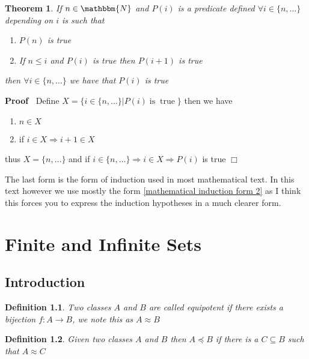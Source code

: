 \documentclass{book}
\newcommand{\tmop}[1]{\ensuremath{\operatorname{#1}}}
\newcommand{\upl}{+}
\newenvironment{proof}{\noindent\textbf{Proof\ }}{\hspace*{\fill}$\Box$\medskip}
\newtheorem{definition}{Definition}
{\theorembodyfont{\rmfamily}\newtheorem{example}{Example}}
\newtheorem{theorem}{Theorem}
\begin{document}
{{\begin{theorem}
  \label{mathematical induction form 3}If $n \in \mathbbm{N}$ and $P (i)$ is a
  predicate defined $\forall i \in \{ n, \ldots \}$ depending on $i$ is such
  that
  \begin{enumerate}
    \item $P (n)$ is true
    
    \item If $n \leqslant i$ and $P (i)$ is true then $P (i \upl 1)$ is true
  \end{enumerate}
  then $\forall i \in \{ n, \ldots \}$ we have that $P (i)$ is true
\end{theorem}

\begin{proof}
  Define $X = \{ i \in \{ n, \ldots \} |P (i) \tmop{is} \tmop{true} \}$ then
  we have
  \begin{enumerate}
    \item $n \in X$
    
    \item if $i \in X \Rightarrow i \upl 1 \in X$
  \end{enumerate}
  thus $X = \{ n, \ldots \}$ and if $i \in \{ n, \ldots \} \Rightarrow i \in X
  \Rightarrow P (i)$ is true
\end{proof}

The last form is the form of induction used in most mathematical text. In this
text however we use mostly the form \ref{mathematical induction form 2} as I
think this forces you to express the induction hypotheses in a much clearer
form.

\chapter{Finite and Infinite Sets}

\section{Introduction}

\begin{definition}
  \label{equipotent}{}Two classes $A$ and $B$ are called
  equipotent if there exists a bijection $f : A \rightarrow B$, we note this
  as $A \approx B$
\end{definition}

\begin{definition}
  Given two classes $A$ and $B$ then $A \preccurlyeq B$ if there is a $C
  \subseteq B$ such that $A \approx C$
\end{definition}

}}
\end{document}
